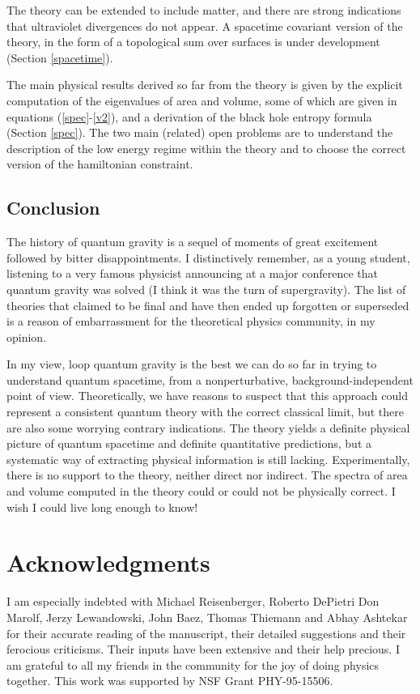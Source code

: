 The theory can be extended to include matter, and there are strong 
indications that ultraviolet divergences do not appear.  A spacetime 
covariant version of the theory, in the form of a topological sum over 
surfaces is under development (Section \ref{spacetime}).

The main physical results derived so far from the theory is given 
by the explicit computation of the eigenvalues of area and volume, 
some of which are given in equations (\ref{spec}-\ref{v2}), and a 
derivation of the black hole entropy formula (Section \ref{spec}).  
The two main (related) open problems are to understand the 
description of the low energy regime within the theory and to 
choose the correct version of the hamiltonian constraint.

\subsection{Conclusion}\label{9} 

The history of quantum gravity is a sequel of moments of great 
excitement followed by bitter disappointments.  I distinctively 
remember, as a young student, listening to a very famous physicist 
announcing at a major conference that quantum gravity was solved (I 
think it was the turn of supergravity).  The list of theories that 
claimed to be final and have then ended up forgotten or superseded is 
a reason of embarrassment for the theoretical physics community, in my 
opinion.

In my view, loop quantum gravity is the best we can do so far in 
trying to understand quantum spacetime, from a nonperturbative, 
background-independent point of view.  Theoretically, we have reasons 
to suspect that this approach could represent a consistent quantum 
theory with the correct classical limit, but there are also some 
worrying contrary indications.  The theory yields a definite physical 
picture of quantum spacetime and definite quantitative predictions, 
but a systematic way of extracting physical information is still 
lacking.  Experimentally, there is no support to the theory, neither 
direct nor indirect.  The spectra of area and volume computed in the 
theory could or could not be physically correct.  I wish I could live 
long enough to know!


\section*{Acknowledgments}

I am especially indebted with Michael Reisenberger, Roberto DePietri 
Don Marolf, Jerzy Lewandowski, John Baez, Thomas Thiemann and Abhay 
Ashtekar for their accurate reading of the manuscript, their detailed 
suggestions and their ferocious criticisms.  Their inputs have been 
extensive and their help precious.  I am grateful to all my friends in 
the community for the joy of doing physics together.  This work was 
supported by NSF Grant PHY-95-15506.





